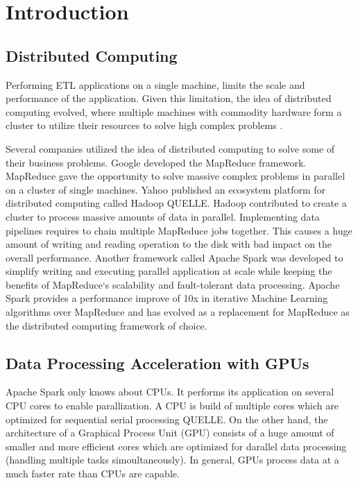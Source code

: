 \chapter{Introduction}
\label{sec:introduction}

\section{Distributed Computing}
Performing ETL applications on a single machine, limits the scale and performance of the application. Given this limitation, the idea of distributed computing evolved, where multiple machines with commodity hardware form a cluster to utilize their resources to solve high complex problems \cite{Ganelin2016Spark}.

Several companies utilized the idea of distributed computing to solve some of their business problems. 
Google developed the MapReduce \cite{Dean2004MapReduce} framework. MapReduce gave the opportunity to solve massive complex problems in parallel on a cluster of single machines.
Yahoo published an ecosystem platform for distributed computing called Hadoop QUELLE. Hadoop contributed to create a cluster to process massive amounts of data in parallel.
Implementing data pipelines requires to chain multiple MapReduce jobs together. This causes a huge amount of writing and reading operation to the disk with bad impact on the overall performance. Another framework called Apache Spark was developed to simplify writing and executing parallel application at scale while keeping the benefits of MapReduce`s scalability and fault-tolerant data processing. Apache Spark provides a performance improve of 10x in iterative Machine Learning algorithms over MapReduce \cite{Zaharia2010Spark} and has evolved as a replacement for MapReduce as the distributed computing framework of choice.


\section{Data Processing Acceleration with GPUs}
Apache Spark only knows about CPUs. It performs its application on several CPU cores to enable parallization.
A CPU is build of multiple cores which are optimized for sequential serial processing QUELLE.
On the other hand, the architecture of a Graphical Process Unit (GPU) consists of a huge amount of smaller and more efficient cores which are optimized for darallel data processing (handling multiple tasks simoultaneously). In general, GPUs process data at a much faster rate than CPUs are capable.


